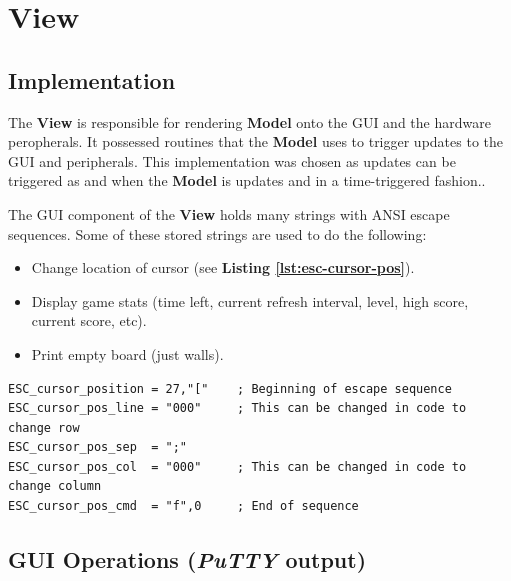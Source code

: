   \section{View}

  \subsection{Implementation}

  The \textbf{View} is responsible for rendering \textbf{Model} onto the GUI and the hardware peropherals.
  It possessed routines that the \textbf{Model} uses to trigger updates to the GUI and peripherals.
  This implementation was chosen as updates can be triggered as and when the \textbf{Model} is updates and in a time-triggered fashion..

  The GUI component of the \textbf{View} holds many strings with ANSI escape sequences.
  Some of these stored strings are used to do the following:

  \begin{itemize}
    \item Change location of cursor (see \textbf{Listing \ref{lst:esc-cursor-pos}}).
    \item Display game stats (time left, current refresh interval, level, high score, current score, etc).
    \item Print empty board (just walls).
  \end{itemize}

    \begin{lstlisting}[caption={Escape sequence to change cursor position},label={lst:esc-cursor-pos}]
ESC_cursor_position	= 27,"["    ; Beginning of escape sequence
ESC_cursor_pos_line	= "000"     ; This can be changed in code to change row
ESC_cursor_pos_sep	= ";"
ESC_cursor_pos_col	= "000"     ; This can be changed in code to change column
ESC_cursor_pos_cmd	= "f",0     ; End of sequence

  \end{lstlisting}


  \subsection{GUI Operations (\textit{PuTTY} output)}


